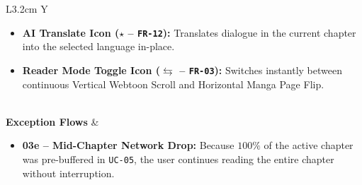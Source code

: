 \begin{table}[H]
\begin{tabularx}{\textwidth}{L{3.2cm} Y}
\begin{enumerate}[nosep,leftmargin=1.4em]
\begin{itemize}[nosep]
        \item \textbf{AI Translate Icon ($\star$ -- \texttt{FR-12}):} Translates dialogue in the current chapter into the selected language in-place.
        \item \textbf{Reader Mode Toggle Icon ($\leftrightarrows$ -- \texttt{FR-03}):} Switches instantly between continuous Vertical Webtoon Scroll and Horizontal Manga Page Flip.
    \end{itemize}
\end{enumerate} \\
\textbf{Exception Flows} &
\begin{itemize}[nosep,leftmargin=1.4em]
    \item \textbf{03e -- Mid-Chapter Network Drop:} Because $100\%$ of the active chapter was pre-buffered in \texttt{UC-05}, the user continues reading the entire chapter without interruption.
\end{itemize} \\
\bottomrule
\end{tabularx}
\end{table}

